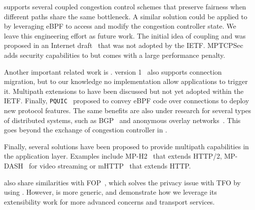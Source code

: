 \mptcp \cite{raiciu2012hard,rfc6824} supports several coupled congestion
control schemes \cite{peng2014multipath,wischik2011design,khalili2013mptcp} 
that preserve fairness when different paths share the same bottleneck. A 
similar solution  could be applied to \tcpls by leveraging eBPF to access and 
modify the  congestion controller state. We leave this engineering effort as 
future work. The initial idea of coupling \mptcp and \tls was proposed in an
Internet draft~\cite{draft-paasch-mptcp-ssl-00} that was not adopted by the
IETF. MPTCPSec~\cite{jadin2017securing} adds security capabilities to \mptcp but
comes with a large performance penalty.

Another important related work is \quic. %
\quic version 1~\cite{rfc9000} also supports connection migration, but to our knowledge no implementation allow applications to trigger  it. %
Multipath extensions
\cite{viernickel2018multipath,de2017multipath,draft-liu-multipath-quic-02}
to \quic have been discussed but not yet adopted within the IETF. Finally,
\texttt{PQUIC}~\cite{de2019pluginizing} proposed to convey eBPF code over \quic
connections to deploy new protocol features. The same benefits are also under
research for several types of distributed systems, such as BGP~\cite{xBGP} and
anonymous overlay networks~\cite{fan-hotpets}. This goes beyond the exchange of
congestion controller in \tcpls.

Finally, several solutions have been proposed to provide multipath capabilities
in the application layer. Examples include MP-H2~\cite{nikravesh2019mp} that
extends HTTP/2, MP-DASH~\cite{han2016mp} for video streaming or mHTTP~\cite{kim2014multi} that extends HTTP.

\tcpls also share similarities with \tls FOP~\cite{sy2020enhanced}, which
solves the privacy issue with TFO by using \tls. However, \tcpls is more generic, and demonstrate how we leverage its extensibility work for more advanced  concerns and transport services.


